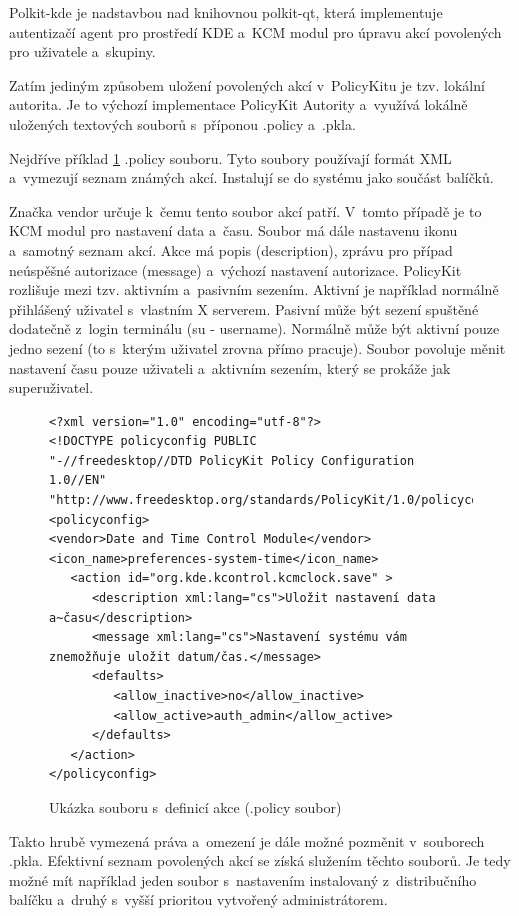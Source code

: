 Polkit-kde je nadstavbou nad knihovnou polkit-qt, která implementuje autentizačí
agent pro prostředí KDE a~KCM modul pro úpravu akcí povolených pro uživatele
a~skupiny. %

Zatím jediným způsobem uložení povolených akcí v~PolicyKitu je tzv. lokální
autorita. Je to výchozí implementace PolicyKit Autority a~využívá lokálně
uložených textových souborů s~příponou .policy a~.pkla.

Nejdříve příklad \ref{fig:pkit_policy} .policy souboru. Tyto soubory používají
formát XML a~vymezují seznam známých akcí. Instalují se do systému jako součást
balíčků.

Značka vendor určuje k~čemu tento soubor akcí patří. V~tomto případě je to KCM
modul pro nastavení data a~času. Soubor má dále nastavenu ikonu a~samotný seznam
akcí. Akce má popis (description), zprávu pro případ neúspěšné autorizace
(message) a~výchozí nastavení autorizace. PolicyKit rozlišuje mezi tzv. aktivním
a~pasivním sezením. Aktivní je například normálně přihlášený uživatel s~vlastním
X serverem. Pasivní může být sezení spuštěné dodatečně z~login terminálu
(su - username). Normálně může být aktivní pouze jedno sezení (to s~kterým
uživatel zrovna přímo pracuje). Soubor povoluje měnit nastavení času pouze
uživateli a~aktivním sezením, který se prokáže jak superuživatel.

\begin{figure}[h]
\centering
\begin{verbatim}
<?xml version="1.0" encoding="utf-8"?>
<!DOCTYPE policyconfig PUBLIC
"-//freedesktop//DTD PolicyKit Policy Configuration 1.0//EN"
"http://www.freedesktop.org/standards/PolicyKit/1.0/policyconfig.dtd">
<policyconfig>
<vendor>Date and Time Control Module</vendor>
<icon_name>preferences-system-time</icon_name>
   <action id="org.kde.kcontrol.kcmclock.save" >
      <description xml:lang="cs">Uložit nastavení data a~času</description>
      <message xml:lang="cs">Nastavení systému vám znemožňuje uložit datum/čas.</message>
      <defaults>
         <allow_inactive>no</allow_inactive>
         <allow_active>auth_admin</allow_active>
      </defaults>
   </action>
</policyconfig>
\end{verbatim}
\caption{Ukázka souboru s~definicí akce (.policy soubor)}
\label{fig:pkit_policy}
\end{figure}

Takto hrubě vymezená práva a~omezení je dále možné pozměnit v~souborech .pkla.
Efektivní seznam povolených akcí se získá služením těchto souborů. Je tedy možné
mít například jeden soubor s~nastavením instalovaný z~distribučního balíčku
a~druhý s~vyšší prioritou vytvořený administrátorem.

